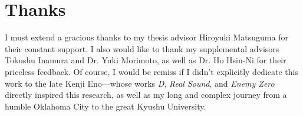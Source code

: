 \documentclass{report}
\begin{document}
\section{Thanks}
I must extend a gracious thanks to my thesis advisor Hiroyuki Matsuguma for their constant support. I also would like to thank my supplemental advisors Tokushu Inamura and Dr. Yuki Morimoto, as well as Dr. Ho Hsin-Ni for their priceless feedback. Of course, I would be remiss if I didn't explicitly dedicate this work to the late Kenji Eno---whose works \emph{D}, \emph{Real Sound}, and \emph{Enemy Zero} directly inspired this research, as well as my long and complex journey from a humble Oklahoma City to the great Kyushu University. 

% 
\printbibliography
\end{document}
